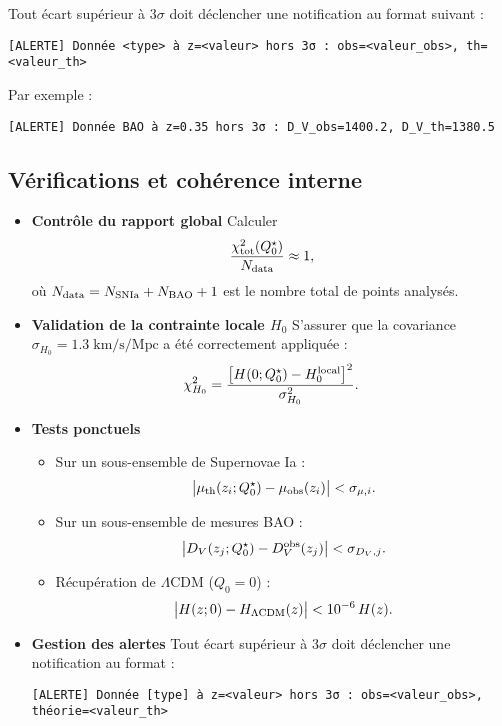 Tout écart supérieur à \(3\sigma\) doit déclencher une notification au format suivant :

\begin{verbatim}
[ALERTE] Donnée <type> à z=<valeur> hors 3σ : obs=<valeur_obs>, th=<valeur_th>
\end{verbatim}

Par exemple :

\begin{verbatim}
[ALERTE] Donnée BAO à z=0.35 hors 3σ : D_V_obs=1400.2, D_V_th=1380.5
\end{verbatim}

\subsection{Vérifications et cohérence interne}

\begin{itemize}
  \item \textbf{Contrôle du rapport global}  
    Calculer  
    \[
      \frac{\chi^{2}_{\rm tot}(Q_{0}^{\star})}{N_{\rm data}}
      \approx 1,
    \]
    où \(N_{\rm data} = N_{\rm SNIa} + N_{\rm BAO} + 1\) est le nombre total de points analysés.

  \item \textbf{Validation de la contrainte locale \(H_{0}\)}  
    S’assurer que la covariance \(\sigma_{H_{0}} = 1.3\;\mathrm{km/s/Mpc}\) a été correctement appliquée :
    \[
      \chi^{2}_{H_{0}}
      = \frac{\bigl[H(0;Q_{0}^{\star}) - H_{0}^{\rm local}\bigr]^{2}}
             {\sigma_{H_{0}}^{2}}.
    \]

  \item \textbf{Tests ponctuels}  
    \begin{itemize}
      \item Sur un sous-ensemble de Supernovae Ia :  
        \[
          \bigl|\mu_{\rm th}(z_i;Q_{0}^{\star}) - \mu_{\rm obs}(z_i)\bigr|
          < \sigma_{\mu,i}.
        \]
      \item Sur un sous-ensemble de mesures BAO :  
        \[
          \bigl|D_{V}(z_j;Q_{0}^{\star}) - D_{V}^{\rm obs}(z_j)\bigr|
          < \sigma_{D_{V},j}.
        \]
      \item Récupération de \(\Lambda\)CDM (\(Q_{0}=0\)) :  
        \[
          \bigl|H(z;0) - H_{\Lambda\rm CDM}(z)\bigr|
          < 10^{-6}\,H(z).
        \]
    \end{itemize}

  \item \textbf{Gestion des alertes}  
    Tout écart supérieur à \(3\sigma\) doit déclencher une notification au format :
    \begin{verbatim}
[ALERTE] Donnée [type] à z=<valeur> hors 3σ : obs=<valeur_obs>, théorie=<valeur_th>
    \end{verbatim}
\end{itemize}

